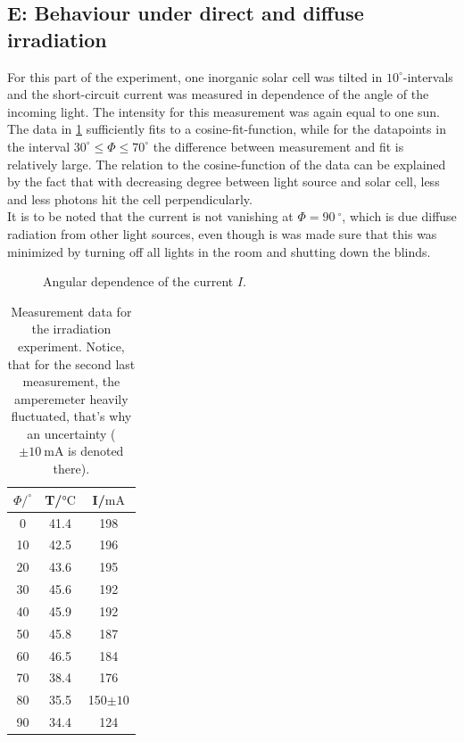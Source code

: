 \documentclass[english,  %
parskip=full,  %
headsepline]{scrartcl}
\begin{document}
\pagebreak
\subsection{E: Behaviour under direct and diffuse irradiation}
For this part of the experiment, one inorganic solar cell was tilted in $10^{\circ}$-intervals and the short-circuit current was measured in dependence of the angle of the incoming light. The intensity for this measurement was again equal to one sun. The data in \cref{fig:E} sufficiently fits to a cosine-fit-function, while for the datapoints in the interval $30^{\circ}\le\Phi \le 70^{\circ}$ the difference between measurement and fit is relatively large. The relation to the cosine-function of the data can be explained by the fact that with decreasing degree between light source and solar cell, less and less photons hit the cell perpendicularly.\\
It is to be noted that the current is not vanishing at $\Phi=\SI{90}{^{\circ}}$, which is due diffuse radiation from other light sources, even though is was made sure that this was minimized by turning off all lights in the room and shutting down the blinds.
\begin{figure}[H]
    \centering
    
    \caption{Angular dependence of the current $I$.}
    \label{fig:E}
\end{figure}

\begin{table}[!htp]
    \centering
        \caption{Measurement data for the irradiation experiment. Notice, that for the second last measurement, the amperemeter heavily fluctuated, that's why an uncertainty ($\pm\SI{10}{\milli \ampere}$ is denoted there).}
    \begin{tabular}{c|c|c}
         $\Phi /^{\circ}$ & T/$\si{\celsius}$&I/$\si{\milli \ampere}$\\\hline \hline
         0&41.4&198\\
         10&42.5&196\\
         20&43.6&195\\
         30&45.6&192\\
         40&45.9&192\\
         50&45.8&187\\
         60&46.5&184\\
         70&38.4&176\\
         80&35.5&150$\pm10$\\
         90&34.4&124
    \end{tabular}
    \label{tab:Etemp}
\end{table}
\end{document}
